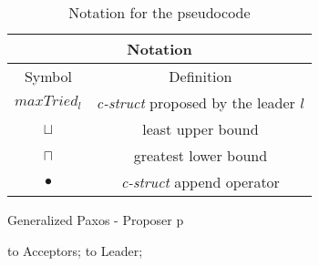 \begin{table}[h!]
	\renewcommand{\arraystretch}{1.5}
	\centering
	\begin{tabular}{ |c|c|}
		\hline
		\multicolumn{2}{|c|}{Notation}\\
		\hline
		Symbol & Definition \\
		\hline
		$maxTried_l$  & \textit{c-struct} proposed by the leader $l$ \\
		\hline
		$\sqcup$ & least upper bound \\
		\hline
		$\sqcap$ & greatest lower bound \\
		\hline
		$\bullet$ & \textit{c-struct} append operator \\
		\hline
	\end{tabular} 
	\caption{Notation for the pseudocode} 
	\label{table:1}
\end{table}

\begin{algorithm}
	\caption{Generalized Paxos - Proposer p}
	\begin{algorithmic}[1]
		
		\State {} to Acceptors;
		\Else
		\State {} to Leader;
		\EndIf
		\EndFunction
		
		
	\end{algorithmic}
\end{algorithm}


